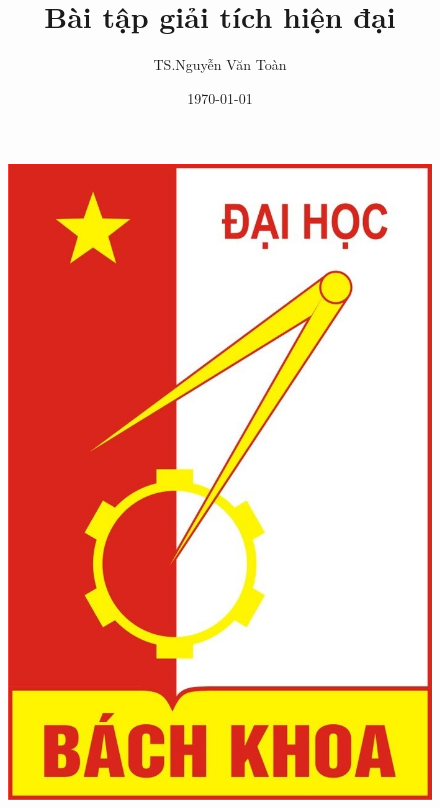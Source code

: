 \documentclass[12pt,a4paper]{article}
\begin{document}


\author{TS.Nguyễn Văn Toàn}    %
\title{Bài tập giải tích hiện đại}    %
\date{\today{}}  %

\maketitle{}   %
\begin{center}       %
    \begin{figure}[htp]
    \begin{center}
     \includegraphics[scale=.2]{logo}
    \end{center}
    \label{}
    \end{figure}
\end{center}
\end{document}
